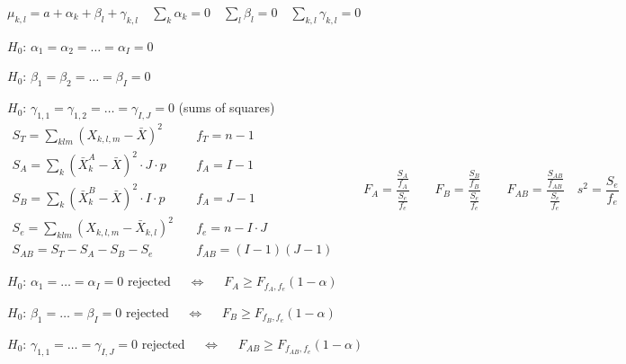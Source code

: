 \documentclass[twoside]{book}
\begin{document}
\newline \hspace*{5mm} $\mu_{k,l}=a+\alpha_{k}+\beta_{l}+\gamma_{k,l}\quad \sum_{k}\alpha_{k}=0 \quad \sum_{l}\beta_{l}=0\quad \sum_{k,l}\gamma_{k,l}=0$
 \par $H_0$:   $\alpha_1=\alpha_2=\dots=\alpha_{I}=0$
\par $H_0$:   $\beta_1=\beta_2=\dots=\beta_{I}=0$
\par $H_0$:   $\gamma_{1,1}=\gamma_{1,2}=\dots=\gamma_{I,J}=0$
\vspace*{3mm}\newline
(sums of squares)
$$\begin{array}{ll}
S_{T}=\sum_{klm} (X_{k,l,m}-\bar{X})^2\quad & f_{T}=n-1 \\
S_{A}=\sum_{k} (\bar{X}^{A}_{k}-\bar{X})^2\cdot J\cdot p\quad & f_{A}=I-1 \\
S_{B}=\sum_{k} (\bar{X}^{B}_{k}-\bar{X})^2\cdot I\cdot p\quad & f_{A}=J-1 \\
S_{e}=\sum_{klm} (X_{k,l,m}-\bar{X}_{k,l})^2\quad & f_{e}=n-I\cdot J \\
S_{AB}=S_{T}-S_{A}-S_{B}-S_{e}\quad & f_{AB}=(I-1)(J-1)
\end{array}   \qquad F_{A}=\frac{\frac{S_{A}}{f_{A}}}{\frac{S_{e}}{f_{e}}}\qquad F_{B}=\frac{\frac{S_{B}}{f_{B}}}{\frac{S_{e}}{f_{e}}}\qquad F_{AB}=\frac{\frac{S_{AB}}{f_{AB}}}{\frac{S_{e}}{f_{e}}}  \quad s^2=\frac{S_{e}}{f_{e}}$$
\par $H_0$:  $\alpha_1=\dots = \alpha_I = 0$ rejected $\quad\Longleftrightarrow \quad$ $ F_{A}\geq F_{f_{A},f_{e}}(1-\alpha)$
\par $H_0$:  $\beta_1=\dots = \beta_I = 0$ rejected $\quad\Longleftrightarrow \quad $ $F_{B}\geq F_{f_{B},f_{e}}(1-\alpha)$
\par $H_0$:  $\gamma_{1,1}=\dots = \gamma_{I,J} = 0$ rejected $\quad\Longleftrightarrow \quad $ $ F_{AB}\geq F_{f_{AB},f_{e}}(1-\alpha)$
\end{document}
